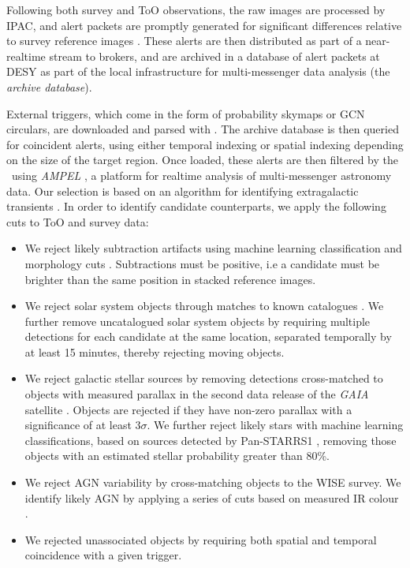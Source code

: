 Following both survey and ToO observations, the raw images are processed by IPAC, and alert packets are promptly generated for significant differences relative to survey reference images . These alerts are then distributed as part of a near-realtime stream to brokers, and are archived in a database of alert packets at DESY as part of the local infrastructure for multi-messenger data analysis (the \emph{archive database}).

External triggers, which come in the form of probability skymaps or GCN circulars, are downloaded and parsed with \ztf. The archive database is then queried for coincident alerts, using either temporal indexing or spatial indexing depending on the size of the target region. Once loaded, these alerts are then filtered by the \ztf~using \emph{AMPEL} , a platform for realtime analysis of multi-messenger astronomy data. Our selection is based on an algorithm for identifying extragalactic transients \cite{ampel}. In order to identify candidate counterparts, we apply the following cuts to ToO and survey data:

\begin{itemize}
	\item We reject likely subtraction artifacts using machine learning classification and morphology cuts . Subtractions must be positive, i.e a candidate must be brighter than the same position in stacked reference images.
	\item We reject solar system objects through matches to known catalogues \cite{ztf_ml_19}. We further remove uncatalogued solar system objects by requiring multiple detections for each candidate at the same location, separated temporally by at least 15 minutes, thereby rejecting moving objects.
	\item We reject galactic stellar sources by removing detections cross-matched to objects with measured parallax in the second data release of the \emph{GAIA} satellite . Objects are rejected if they have non-zero parallax with a significance of at least 3$\sigma$. We further reject likely stars with machine learning classifications, based on sources detected by Pan-STARRS1 , removing those objects with an estimated stellar probability greater than 80\%. 
	\item We reject AGN variability by cross-matching objects to the WISE survey. We identify likely AGN by applying a series of cuts based on measured IR colour .
	\item We rejected unassociated objects by requiring both spatial and temporal coincidence with a given trigger.
\end{itemize}

